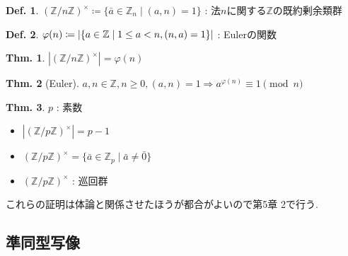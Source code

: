\documentclass[uplatex,dvipdfmx,9pt]{beamer}
\newcommand{\lt}{\ensuremath <}
\newcommand{\sscount}{\textsection \thesubsection}
\newcounter{textExmCount}
\theoremstyle{definition} %
\newtheorem{defn}{Def.}[subsection] %
\newtheorem{thm}{Thm.}[subsection] %
\theoremstyle{example}
\begin{document}
    \begin{frame}
 
      \begin{defn}
        $(\mathbb{Z} / n\mathbb{Z})^\times \coloneqq \{\bar{a} \in \mathbb{Z}_n \mid (a, n) = 1\}$ : 法$n$に関する$\mathbb{Z}$の\alert{既約剰余類群}
      \end{defn}

      \begin{defn}
        $\varphi(n) \coloneqq |\{a \in \mathbb{Z} \mid 1 \le a \lt n, (n, a) = 1\}|$ : \alert{Eulerの関数}
      \end{defn}

      \begin{thm}
        $|(\mathbb{Z} / n\mathbb{Z})^\times| = \varphi(n)$
      \end{thm}

      \begin{thm}[Euler]
        $a, n \in \mathbb{Z}, n \ge 0, (a, n) = 1 \Rightarrow a^{\varphi(n)} \equiv 1 \pmod{n}$
      \end{thm}

    \end{frame}

    \begin{frame}
 
      \begin{thm}
        $p$ : 素数
        \begin{itemize}
          \item $|(\mathbb{Z} / p\mathbb{Z})^\times| = p - 1$
          \item $(\mathbb{Z} / p\mathbb{Z})^\times = \{\bar{a} \in \mathbb{Z}_p \mid \bar{a} \neq \bar{0}\}$
          \item $(\mathbb{Z} / p\mathbb{Z})^\times$ : 巡回群
        \end{itemize}
      \end{thm}
      これらの証明は体論と関係させたほうが都合がよいので第5章 \textsection 2で行う.
      
    \end{frame}

    \subsection{\sscount 準同型写像}
    \setcounter{textExmCount}{0}
\end{document}
